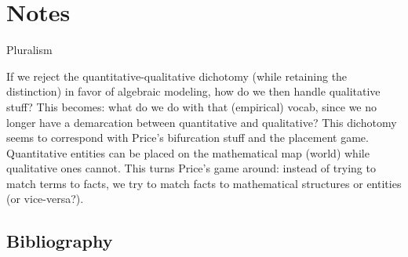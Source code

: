 \documentclass[11pt,twoside]{article}
\begin{document}
\noindent
\cite{smith_refining_2011}

\section{Notes}

Pluralism

If we reject the quantitative-qualitative dichotomy (while retaining
the distinction) in favor of algebraic modeling, how do we then handle
qualitative stuff?  This becomes: what do we do with that (empirical)
vocab, since we no longer have a demarcation between quantitative and
qualitative?  This dichotomy seems to correspond with Price's
bifurcation stuff and the placement game.  Quantitative entities can
be placed on the mathematical map (world) while qualitative ones
cannot.  This turns Price's game around: instead of trying to match
terms to facts, we try to match facts to mathematical structures or
entities (or vice-versa?).

\clearpage
\appendix
\begin{appendices}
\section{Bibliography}
\printbibliography[heading=none]
\end{appendices}
\end{document}
